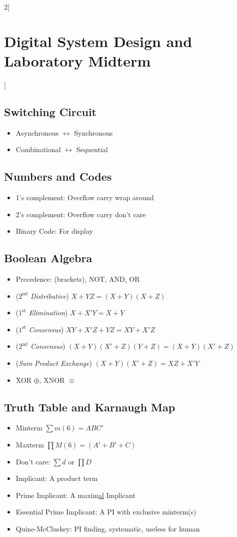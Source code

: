 \documentclass[10pt,a4paper,twoside]{article}
\begin{document}
	\clearpage
	\begin{multicols}{2}[\section*{Digital System Design and Laboratory Midterm}]
		\subsection*{Switching Circuit}
		\begin{itemize}
			\item Asynchronous $\leftrightarrow$ Synchronous
			\item Combinational $\leftrightarrow$ Sequential 
		\end{itemize}
		\subsection*{Numbers and Codes}
		\begin{itemize}
			\item 1's complement: Overflow carry wrap around
			\item 2's complement: Overflow carry don't care
			\item Binary Code: For display
		\end{itemize}
		\subsection*{Boolean Algebra}
		\begin{itemize}
			\item Precedence: (brackets), NOT, AND, OR
			\item (\textit{$2^{\text{nd}}$ Distributive}) $X + YZ = (X + Y)(X + Z)$
			\item (\textit{$1^{\text{st}}$ Elimination}) $X + X'Y = X + Y$
			\item (\textit{$1^{\text{st}}$ Consensus}) $XY + X'Z + YZ = XY + X'Z$
			\item (\textit{$2^{\text{nd}}$ Consensus}) $(X + Y)(X' + Z)(Y + Z) = (X + Y)(X' + Z)$
			\item (\textit{Sum Product Exchange}) $(X + Y)(X' + Z) = XZ + X'Y$
			\item XOR $\oplus$, XNOR $\equiv$
		\end{itemize}
		\subsection*{Truth Table and Karnaugh Map}
		\begin{itemize}
			\item Minterm $\sum m (6) = ABC'$
			\item Maxterm $\prod M (6) = (A' + B' + C)$
			\item Don't care: $\sum d$ or $\prod D$
			\item Implicant: A product term
			\item Prime Implicant: A maxim\underline{al} Implicant
			\item Essential Prime Implicant: A PI with exclusive minterm(s)
			\item Quine-McCluskey: PI finding, systematic, useless for human
		\end{itemize}

\end{multicols}
\end{document}
